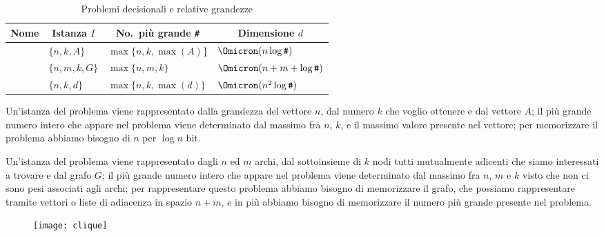 \begin{table}[H]\centering
	\caption{Problemi decisionali e relative grandezze}
	\label{tab:problem-dimensions}
	\begin{tabular}{@{} l *{3}{l} @{}}
		\toprule
			\textbf{Nome} & \multicolumn{1}{c}{\textbf{Istanza} \(I\)} & \multicolumn{1}{c}{\textbf{No.\ più grande} \texttt{\#}} & \multicolumn{1}{c}{\textbf{Dimensione} \(d\)} \\
		\midrule
			{\subSetSumProblem} & \(\{n, k, A\}\)    & \(\max\{n, k, \max(A)\)\} & \(\Omicron(n \log\texttt{\#})\)\\
		\lightrule
			{\cliqueProblem}    & \(\{n, m, k, G\}\) & \(\max\{n,m,k\}\) & \(\Omicron(n + m + \log\texttt{\#})\)\\
		\lightrule
			{\tsp} & \(\{n,k,d\}\) & \(\max\{n, k, \max(d)\}\) & \(\Omicron(n^2 \log\texttt{\#})\)\\
		\bottomrule
	\end{tabular}
\end{table}

Un'istanza del problema {\subSetSumProblem} viene rappresentato dalla grandezza del vettore \(n\), dal numero \(k\) che voglio ottenere e dal vettore \(A\);
il più grande numero intero che appare nel problema viene determinato dal massimo fra \(n\), \(k\), e il massimo valore presente nel vettore;
per memorizzare il problema abbiamo bisogno di \(n\) per \(\log n\) bit.

\begin{minipage}[c]{.7\textwidth}
Un'istanza del problema {\cliqueProblem} viene rappresentato dagli \(n\) ed \(m\) archi, dal sottoinsieme di \(k\) nodi tutti mutualmente adicenti che siamo interessati a trovare e dal grafo \(G\);
il più grande numero intero che appare nel problema viene determinato dal massimo fra \(n\), \(m\) e \(k\) visto che non ci sono pesi associati agli archi;
per rappresentare questo problema abbiamo bisogno di memorizzare il grafo, che possiamo rappresentare tramite vettori o liste di adiacenza in spazio \(n+m\), e in più abbiamo bisogno di memorizzare il numero più grande presente nel problema.
\end{minipage}%
\begin{minipage}[c]{.3\textwidth}
\begin{figure}[H]\centering
	\texttt{[image: clique]}
\end{figure}
\end{minipage}

